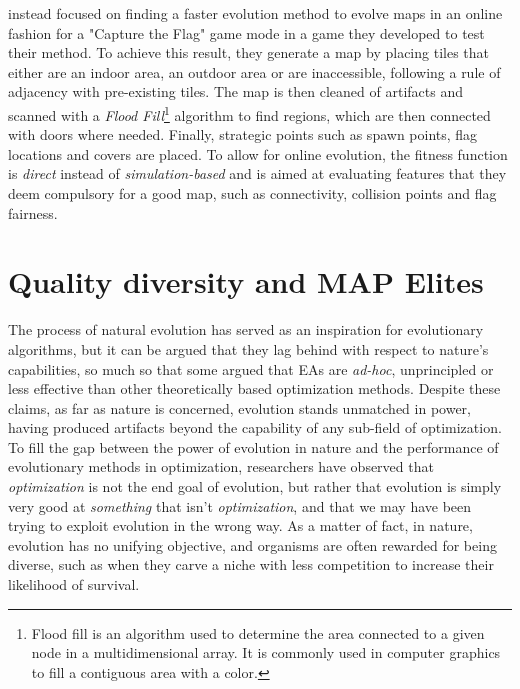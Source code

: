 \citeauthor{bhojan_arena_2014} instead focused on finding a faster evolution method to evolve maps in an online fashion for a "Capture the Flag" game mode in a game they developed to test their method. 
To achieve this result, they generate a map by placing tiles that either are an indoor area, an outdoor area or are inaccessible, following a rule of adjacency with pre-existing tiles. 
The map is then cleaned of artifacts and scanned with a \textit{Flood Fill}\footnote{Flood fill is an algorithm used to determine the area connected to a given node in a multidimensional array. It is commonly used in computer graphics to fill a contiguous area with a color.} algorithm to find regions, which are then connected with doors where needed. Finally, strategic points such as spawn points, flag locations and covers are placed. To allow for online evolution, the fitness function is \textit{direct} instead of \textit{simulation-based} and is aimed at evaluating features that they deem compulsory for a good map, such as connectivity, collision points and flag fairness. \cite{bhojan_arena_2014}


\section{Quality diversity and MAP Elites}
\label{sec:qd}
The process of natural evolution has served as an inspiration for evolutionary algorithms, but it can be argued that they lag behind with respect to nature's capabilities, so much so that some argued that EAs are \textit{ad-hoc}, unprincipled or less effective than other theoretically based optimization methods. Despite these claims, as far as nature is concerned, evolution stands unmatched in power, having produced artifacts beyond the capability of any sub-field of optimization. To fill the gap between the power of evolution in nature and the performance of evolutionary methods in optimization, researchers have observed that \textit{optimization} is not the end goal of evolution, but rather that evolution is simply very good at \textit{something} that isn't \textit{optimization}, and that we may have been trying to exploit evolution in the wrong way. As a matter of fact, in nature, evolution has no unifying objective, and organisms are often rewarded for being diverse, such as when they carve a niche with less competition to increase their likelihood of survival. \cite{pugh_quality_2016}

